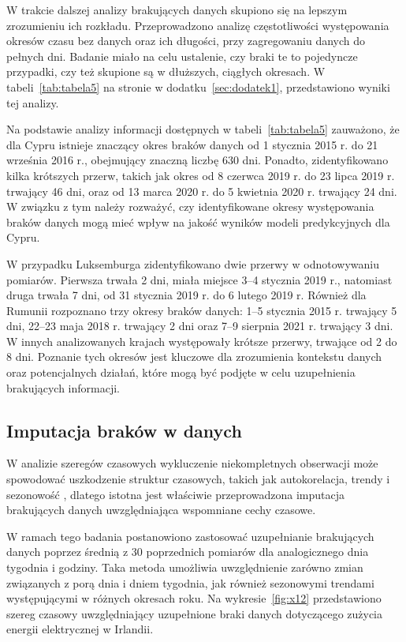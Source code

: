 \documentclass[polish, twoside, 12pt, a4paper]{article}
\theoremstyle{definition}
\theoremstyle{plain}
\theoremstyle{remark}
\begin{document}
W trakcie dalszej analizy brakujących danych skupiono się na lepszym zrozumieniu ich rozkładu. Przeprowadzono analizę częstotliwości występowania okresów czasu bez danych oraz ich długości, przy zagregowaniu danych do pełnych dni. Badanie miało na celu ustalenie, czy braki te to pojedyncze przypadki, czy też skupione są w dłuższych, ciągłych okresach. W tabeli~\ref{tab:tabela5} na stronie \pageref{tab:tabela5} w dodatku~\ref{sec:dodatek1}, przedstawiono wyniki tej analizy. 

Na podstawie analizy informacji dostępnych w tabeli~\ref{tab:tabela5} zauważono, że dla Cypru istnieje znaczący okres braków danych od 1 stycznia 2015 r. do 21 września 2016 r., obejmujący znaczną liczbę 630 dni. Ponadto, zidentyfikowano kilka krótszych przerw, takich jak okres od 8 czerwca 2019 r. do 23 lipca 2019 r. trwający 46 dni, oraz od 13 marca 2020 r. do 5 kwietnia 2020 r. trwający 24 dni. W związku z tym należy rozważyć, czy identyfikowane okresy występowania braków danych mogą mieć wpływ na jakość wyników modeli predykcyjnych dla Cypru.

W przypadku Luksemburga zidentyfikowano dwie przerwy w odnotowywaniu pomiarów. Pierwsza trwała 2 dni, miała miejsce 3--4 stycznia 2019 r., natomiast druga trwała 7 dni, od 31 stycznia 2019 r. do 6 lutego 2019 r. Również dla Rumunii rozpoznano trzy okresy braków danych: 1--5 stycznia 2015 r. trwający 5 dni, 22--23 maja 2018 r. trwający 2 dni oraz 7--9 sierpnia 2021 r. trwający 3 dni. W innych analizowanych krajach występowały krótsze przerwy, trwające od 2 do 8 dni. Poznanie tych okresów jest kluczowe dla zrozumienia kontekstu danych oraz potencjalnych działań, które mogą być podjęte w celu uzupełnienia brakujących informacji.

\subsection{Imputacja braków w danych}

W analizie szeregów czasowych wykluczenie niekompletnych obserwacji może spowodować uszkodzenie struktur czasowych, takich jak autokorelacja, trendy i sezonowość \citep{box1994}, dlatego istotna jest właściwie przeprowadzona imputacja brakujących danych uwzględniająca wspomniane cechy czasowe. 

W ramach tego badania postanowiono zastosować uzupełnianie brakujących danych poprzez średnią z 30 poprzednich pomiarów dla analogicznego dnia tygodnia i godziny. Taka metoda umożliwia uwzględnienie zarówno zmian związanych z porą dnia i dniem tygodnia, jak również sezonowymi trendami występującymi w różnych okresach roku. Na wykresie~\ref{fig:x12} przedstawiono szereg czasowy uwzględniający uzupełnione braki danych dotyczącego zużycia energii elektrycznej w Irlandii.
\end{document}
